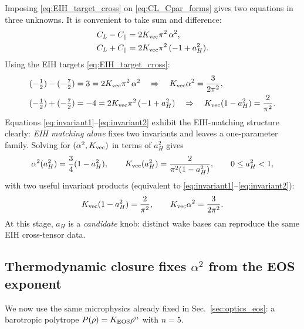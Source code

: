 \documentclass[11pt]{article}
\begin{document}
Imposing \eqref{eq:EIH_target_cross} on \eqref{eq:CL_Cpar_forms} gives two equations in three unknowns.
It is convenient to take sum and difference:
\begin{align}
  C_L-C_\parallel &= 2K_{\rm vec}\pi^2\,\alpha^2,
  \label{eq:diff_CL_Cpar}\\
  C_L+C_\parallel &= 2K_{\rm vec}\pi^2\,(-1+a_H^2).
  \label{eq:sum_CL_Cpar}
\end{align}
Using the EIH targets \eqref{eq:EIH_target_cross}:
\begin{align}
  (-\tfrac12)-(-\tfrac72) &= 3 = 2K_{\rm vec}\pi^2\,\alpha^2
  \quad\Rightarrow\quad
  K_{\rm vec}\alpha^2=\frac{3}{2\pi^2},
  \label{eq:invariant1}\\
  (-\tfrac12)+(-\tfrac72) &= -4 = 2K_{\rm vec}\pi^2\,(-1+a_H^2)
  \quad\Rightarrow\quad
  K_{\rm vec}(1-a_H^2)=\frac{2}{\pi^2}.
  \label{eq:invariant2}
\end{align}
Equations \eqref{eq:invariant1}--\eqref{eq:invariant2} exhibit the EIH-matching structure clearly:
\emph{EIH matching alone} fixes two invariants and leaves a one-parameter family.
Solving for $(\alpha^2,K_{\rm vec})$ in terms of $a_H^2$ gives
\begin{equation}
  \alpha^2(a_H^2)=\frac{3}{4}(1-a_H^2),
  \qquad
  K_{\rm vec}(a_H^2)=\frac{2}{\pi^2(1-a_H^2)},
  \qquad
  0\le a_H^2<1,
  \label{eq:family_alphaK}
\end{equation}
with two useful invariant products (equivalent to \eqref{eq:invariant1}--\eqref{eq:invariant2}):
\begin{equation}
  K_{\rm vec}(1-a_H^2)=\frac{2}{\pi^2},
  \qquad
  K_{\rm vec}\alpha^2=\frac{3}{2\pi^2}.
  \label{eq:family_invariants}
\end{equation}
At this stage, $a_H$ is a \emph{candidate} knob: distinct wake bases can reproduce the same EIH cross-tensor data.

\subsection{Thermodynamic closure fixes \texorpdfstring{$\alpha^2$}{alpha^2} from the EOS exponent}
\label{sec:1pn-interaction-thermo}

We now use the same microphysics already fixed in Sec.~\ref{sec:optics_eos}:
a barotropic polytrope $P(\rho)=K_{\rm EOS}\rho^n$ with $n=5$.
\end{document}
